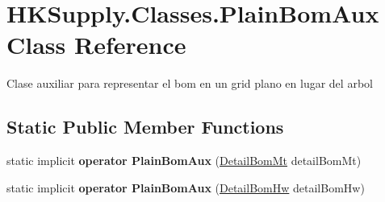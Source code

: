 \hypertarget{class_h_k_supply_1_1_classes_1_1_plain_bom_aux}{}\section{H\+K\+Supply.\+Classes.\+Plain\+Bom\+Aux Class Reference}
\label{class_h_k_supply_1_1_classes_1_1_plain_bom_aux}


Clase auxiliar para representar el bom en un grid plano en lugar del arbol  


\subsection*{Static Public Member Functions}
\begin{DoxyCompactItemize}
\item 
\mbox{\label{class_h_k_supply_1_1_classes_1_1_plain_bom_aux_aca24ee721d570372663de70f5d0bb3b8}} 
static implicit {\bfseries operator Plain\+Bom\+Aux} (\mbox{\hyperlink{class_h_k_supply_1_1_models_1_1_detail_bom_mt}{Detail\+Bom\+Mt}} detail\+Bom\+Mt)
\item 
\mbox{\label{class_h_k_supply_1_1_classes_1_1_plain_bom_aux_aba6fce3b6120f2457f2f3de2de2371d3}} 
static implicit {\bfseries operator Plain\+Bom\+Aux} (\mbox{\hyperlink{class_h_k_supply_1_1_models_1_1_detail_bom_hw}{Detail\+Bom\+Hw}} detail\+Bom\+Hw)
\end{DoxyCompactItemize}
